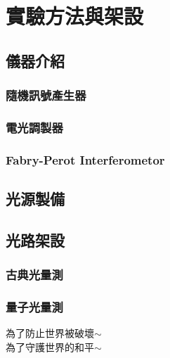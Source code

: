 \documentclass[class=NCU_thesis, crop=false]{standalone}
\begin{document}
\chapter{實驗方法與架設}
\section{儀器介紹}
\subsection{隨機訊號產生器}
\subsection{電光調製器}
\subsection{Fabry-Perot Interferometor}
\section{光源製備}
\section{光路架設}
\subsection{古典光量測}
\subsection{量子光量測}
為了防止世界被破壞$\sim$ \\
為了守護世界的和平$\sim$
\end{document}
